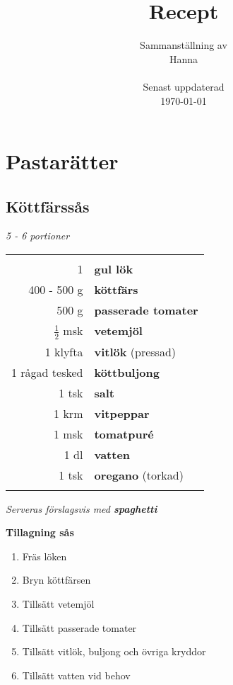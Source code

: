 \documentclass[a4paper,12pt]{article}
\title{\Huge{Recept}}
\author{\begin{tabular}{c}
Sammanställning av\\
Hanna\\
\\
Senast uppdaterad\\
\today\\
\end{tabular}}
\date{} %
\newcommand{\port}[1]{\noindent \textit{#1 portioner}}
\newcommand{\tillb}[1]{\noindent \textit{Serveras förslagsvis med \textbf{#1}} \vspace{1cm}}
\begin{document}
\maketitle

\clearpage

\tableofcontents

\clearpage



\section{Pastarätter}

\clearpage

\subsection{Köttfärssås}
\port{5 - 6}

\begin{table}[H]
	\begin{tabular}{rl}
	\hline
	&\\
		1 & \textbf{gul lök} \\
		400 - 500 g & \textbf{köttfärs}\\
		500 g & \textbf{passerade tomater}\\
		$\frac{1}{2}$ msk & \textbf{vetemjöl}\\
		1 klyfta & \textbf{vitlök} (pressad)\\
		1 rågad tesked & \textbf{köttbuljong}\\
		1 tsk & \textbf{salt}\\
		1 krm & \textbf{vitpeppar}\\
		1 msk & \textbf{tomatpuré}\\
		1 dl & \textbf{vatten}\\
		1 tsk & \textbf{oregano} (torkad) \\
	&\\
	\hline
	\end{tabular}
\end{table}

\tillb{spaghetti}

\begin{multicols*}{2}

\noindent \textbf{Tillagning sås}
\begin{enumerate}
	\itemsep0cm
	\item Fräs löken
	\item Bryn köttfärsen
	\item Tillsätt vetemjöl
	\item Tillsätt passerade tomater
	\item Tillsätt vitlök, buljong och övriga kryddor
	\item Tillsätt vatten vid behov
\end{enumerate}

\end{multicols*}
\end{document}
